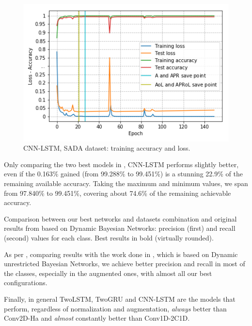\begin{figure}[ht]
    \centering
    \includegraphics[width=\columnwidth]{images/plot-acc-loss-SADA_CNN-LSTM.png}
    \caption{CNN-LSTM, SADA dataset: training accuracy and loss.}
    \label{fig:acc-loss-sada-mixed}
\end{figure}

Only comparing the two best models in , CNN-LSTM performs slightly better, even if the 0.163\% gained (from 99.288\% to 99.451\%) is a stunning 22.9\% of the remaining available accuracy.
Taking the maximum and minimum values, we span from 97.840\% to 99.451\%, covering about 74.6\% of the remaining achievable accuracy.

\begin{table}
\centering
\caption{Comparison between our best networks and datasets combination and original results from \cite{FrankNadales} based on Dynamic Bayesian Networks: precision (first) and recall (second) values for each class. Best results in bold (virtually rounded).}
\label{tab:soa}

\end{table}

As per , comparing results with the work done in \cite{FrankNadales}, which is based on Dynamic unrestricted Bayesian Networks, we achieve better precision and recall in most of the classes, especially in the augmented ones, with almost all our best configurations.

Finally, in general TwoLSTM, TwoGRU and CNN-LSTM are the models that perform, regardless of normalization and augmentation, \textit{always} better than Conv2D-Ha and \textit{almost} constantly better than Conv1D-2C1D.

